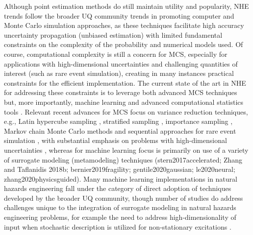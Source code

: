 Although point estimation methods do still maintain utility and popularity, NHE trends follow the broader UQ community trends in promoting computer and Monte Carlo simulation approaches, as these techniques facilitate high accuracy uncertainty propagation (unbiased estimation) with limited fundamental constraints on the complexity of the probability and numerical models used. Of course, computational complexity is still a concern for MCS, especially for applications with high-dimensional uncertainties and challenging quantities of interest (such as rare event simulation), creating in many instances practical constraints for the efficient implementation. The current state of the art in NHE for addressing these constraints is to leverage both advanced MCS techniques \citep{au2003subset,li2017system,bansal2018subset} but, more importantly, machine learning and advanced computational statistics tools \citep{echard2011akmcs, abbiati2017hierarchical, ding2018multifidelity, su2018efficient, wang2018bayesian}. Relevant recent advances for MCS focus on variance reduction techniques, e.g., Latin hypercube sampling \citep{vamvatsikos2014seismic}, stratified sampling \citep{jayaram2010efficient}, importance sampling \citep{papaioannou2018reliability}, Markov chain Monte Carlo methods \citep{au2003subset} and sequential approaches for rare event simulation \citep{jia2017new}, with substantial emphasis on problems with high-dimensional uncertainties \citep{au2003subset,wang2016crossentropybased}, whereas for machine learning focus is primarily on use of a variety of surrogate modeling (metamodeling) techniques (stern2017accelerated; Zhang and Taflanidis 2018b; bernier2019fragility; gentile2020gaussian; le2020neural; zhang2020physicsguided). Many machine learning implementations in natural hazards engineering fall under the category of direct adoption of techniques developed by the broader UQ community, though number of studies do address challenges unique to the integration of surrogate modeling in natural hazards engineering problems, for example the need to address high-dimensionality of input when stochastic description is utilized for non-stationary excitations \citep{gidaris2015kriging}.  

